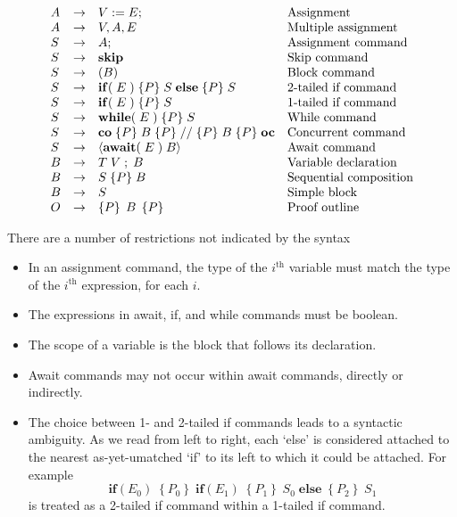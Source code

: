 \documentclass[muchmore,11pt]{article}%
\begin{document}
\[%
\begin{array}
[t]{llll}%
A & \rightarrow & V:=E; & \text{Assignment}\\
A & \rightarrow & V,A,E & \text{Multiple assignment}\\
S & \rightarrow & A; & \text{Assignment command}\\
S & \rightarrow & \mathbf{skip} & \text{Skip command}\\
S & \rightarrow & (B) & \text{Block command}\\
S & \rightarrow & \mathbf{if}(\;E\;)\;\{P\}\;S\;\mathbf{else}\;\{P\}\;S &
\text{2-tailed if command}\\
S & \rightarrow & \mathbf{if}(\;E\;)\;\{P\}\;S & \text{1-tailed if command}\\
S & \rightarrow & \mathbf{while}(\;E\;)\;\{P\}\;S & \text{While command}\\
S & \rightarrow & \mathbf{co}%
\;\{P\}\;B\;\{P\}\;//\;\{P\}\;B\;\{P\}\;\mathbf{oc} & \text{Concurrent
command}\\
S & \rightarrow & \left\langle \mathbf{await}(\;E\;)\;B\right\rangle  &
\text{Await command}\\
B & \rightarrow & T\;V\;;\;B & \text{Variable declaration}\\
B & \rightarrow & S\;\{P\}\;B & \text{Sequential composition}\\
B & \rightarrow & S & \text{Simple block}\\
O & \rightarrow & \left\{  P\right\}  \;B\;\left\{  P\right\}  & \text{Proof
outline}%
\end{array}
\]


There are a number of restrictions not indicated by the syntax

\begin{itemize}
\item In an assignment command, the type of the $i^{\text{th}}$ variable must
match the type of the $i^{\text{th}}$ expression, for each $i$.

\item The expressions in await, if, and while commands must be boolean.

\item The scope of a variable is the block that follows its declaration.

\item Await commands may not occur within await commands, directly or indirectly.

\item The choice between 1- and 2-tailed if commands leads to a syntactic
ambiguity. As we read from left to right, each `else' is considered attached
to the nearest as-yet-umatched `if' to its left to which it could be attached.
For example
\[
\mathbf{if}(E_{0})\;\left\{  P_{0}\right\}  \;\mathbf{if}(E_{1})\;\left\{
P_{1}\right\}  \;S_{0}\;\mathbf{else}\;\left\{  P_{2}\right\}  \;S_{1}%
\]
is treated as a 2-tailed if command within a 1-tailed if command.
\end{itemize}
\end{document}
